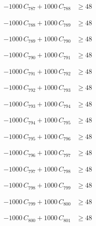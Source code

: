 \documentclass[a4paper,11pt]{article}
\begin{document}
\begin{align}
-1000\,C_{787} + 1000\,C_{788} &\geq 48 \nonumber
\end{align}

\begin{align}
-1000\,C_{788} + 1000\,C_{789} &\geq 48 \nonumber
\end{align}

\begin{align}
-1000\,C_{789} + 1000\,C_{790} &\geq 48 \nonumber
\end{align}

\begin{align}
-1000\,C_{790} + 1000\,C_{791} &\geq 48 \nonumber
\end{align}

\begin{align}
-1000\,C_{791} + 1000\,C_{792} &\geq 48 \nonumber
\end{align}

\begin{align}
-1000\,C_{792} + 1000\,C_{793} &\geq 48 \nonumber
\end{align}

\begin{align}
-1000\,C_{793} + 1000\,C_{794} &\geq 48 \nonumber
\end{align}

\begin{align}
-1000\,C_{794} + 1000\,C_{795} &\geq 48 \nonumber
\end{align}

\begin{align}
-1000\,C_{795} + 1000\,C_{796} &\geq 48 \nonumber
\end{align}

\begin{align}
-1000\,C_{796} + 1000\,C_{797} &\geq 48 \nonumber
\end{align}

\begin{align}
-1000\,C_{797} + 1000\,C_{798} &\geq 48 \nonumber
\end{align}

\begin{align}
-1000\,C_{798} + 1000\,C_{799} &\geq 48 \nonumber
\end{align}

\begin{align}
-1000\,C_{799} + 1000\,C_{800} &\geq 48 \nonumber
\end{align}

\begin{align}
-1000\,C_{800} + 1000\,C_{801} &\geq 48 \nonumber
\end{align}
\end{document}
